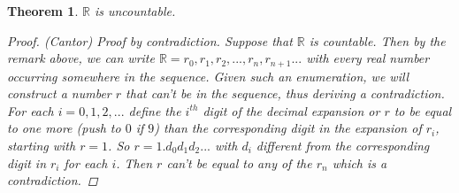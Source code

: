 \documentclass[11pt,a4paper]{report}
\theoremstyle{plain}
\newtheorem{thm}{Theorem}[section]
\theoremstyle{definition}
\theoremstyle{remark}
\begin{document}
\begin{thm}
$\mathbb{R}$ is uncountable.
\begin{proof}{(Cantor)} Proof by contradiction.  Suppose that $\mathbb{R}$ is countable.  Then by the remark above, we can write $\mathbb{R} = r_0, r_1, r_2, ..., r_n, r_{n+1} ...$ with every real number occurring somewhere in the sequence.  Given such an enumeration, we will construct a number $r$ that can't be in the sequence, thus deriving a contradiction.  For each $i = 0, 1, 2, ... $ define the $i^{th}$ digit of the decimal expansion or $r$ to be equal to one more (push to $0$ if $9$)  than the corresponding digit in the expansion of $r_i$, starting with $r = 1$.  So $r = 1.d_0d_1d_2...$ with $d_i$ different from the corresponding digit in $r_i$ for each $i$. Then $r$ can't be equal to any of the $r_n$ which is a contradiction.
\end{proof}
\end{thm}
\end{document}
